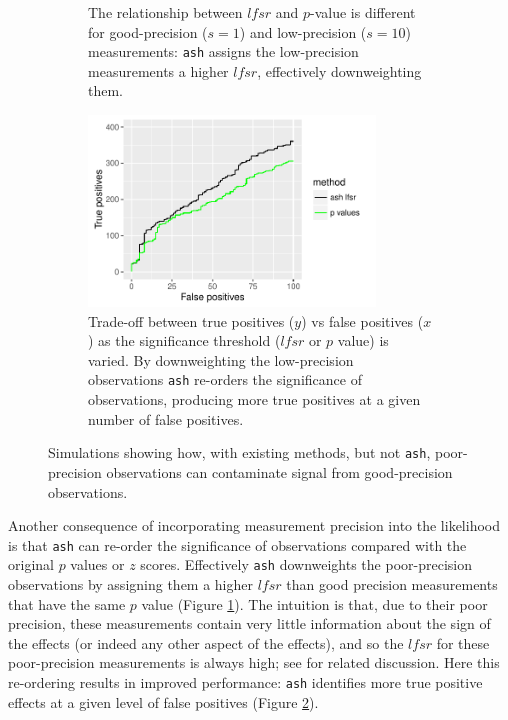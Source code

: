 \documentclass[11pt]{article}
\def\lfsr{\textit{lfsr}}
\def\ash{{\tt ash}\xspace}
\begin{document}
\begin{figure}[hp!]
\begin{subfigure}{0.5\textwidth}
    \caption{The relationship between $\lfsr$ and $p$-value is different for good-precision ($s=1$) and low-precision ($s=10$) measurements: \ash assigns the low-precision measurements a higher $\lfsr$, effectively downweighting them.    %
    } \label{fig:lfsr_pval}
\end{subfigure}
\begin{subfigure}{0.5\textwidth}
\centering\includegraphics[width=3in]{../analysis/figure/make_GOODPOOR_figs.Rmd/tp-fp-1.pdf}
    \caption{Trade-off between true positives ($y$) vs false positives ($x$) as the significance threshold ($\lfsr$ or $p$ value) is varied. By downweighting the low-precision observations \ash re-orders the significance of observations, producing more true positives at a given number of false positives.
    } \label{fig:tpfp}
\end{subfigure}
\caption{Simulations showing how, with existing methods, but not \ash, 
poor-precision observations can contaminate signal from good-precision observations.} \label{fig:goodpoor}
\end{figure}

Another consequence of incorporating measurement precision into the likelihood
is that \ash can re-order the significance of observations compared
 with the original $p$ values or $z$ scores. Effectively \ash downweights the poor-precision 
 observations  by assigning them a higher $\lfsr$ than 
 good precision measurements that have the same $p$ value
 (Figure \ref{fig:lfsr_pval}). 
 The intuition is that, due to their poor precision, these measurements contain very little information about the sign of the effects (or indeed any other aspect of the effects),
 and so the $\lfsr$ for these poor-precision measurements is always high; see \cite{guan.stephens.08} for related discussion. Here this re-ordering results in improved performance: \ash identifies more true positive effects at a given level of false positives (Figure \ref{fig:tpfp}).
\end{document}
